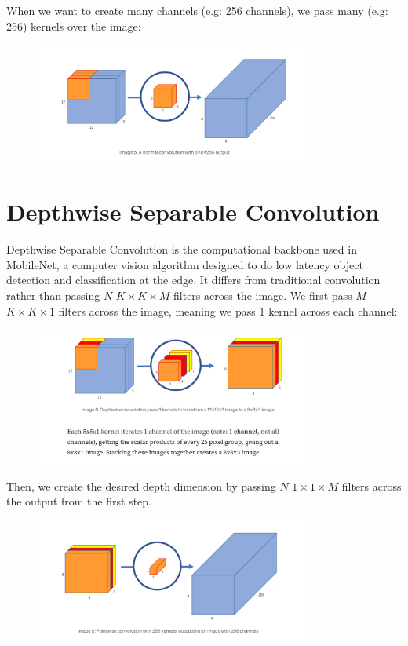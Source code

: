 \documentclass[12pt]{article}
\begin{document}
When we want to create many channels (e.g: 256 channels), we pass many (e.g: 256) kernels over the image: 
\begin{figure}[H]
    \centering
    \includegraphics[width=0.8\textwidth]{./convolution_depth.png} %
\end{figure}


\section{Depthwise Separable Convolution}
Depthwise Separable Convolution is the computational backbone used in MobileNet, a computer vision algorithm designed to do low latency object detection and classification at the edge. It differs from traditional convolution rather than passing \(N\) \(K \times K \times M\) filters across the image. We first pass \(M\) \(K \times K \times 1\) filters across the image, meaning we pass 1 kernel across each channel:

\begin{figure}[H]
    \centering
    \includegraphics[width=0.8\textwidth]{./depthwise_1.png} %

\end{figure}
Then, we create the desired depth dimension by passing \(N\) \(1\times 1\times M\) filters across the output from the first step. 


\begin{figure}[H]
    \centering
    \includegraphics[width=0.8\textwidth]{./depthwise_2.png} %
\end{figure}
\end{document}
